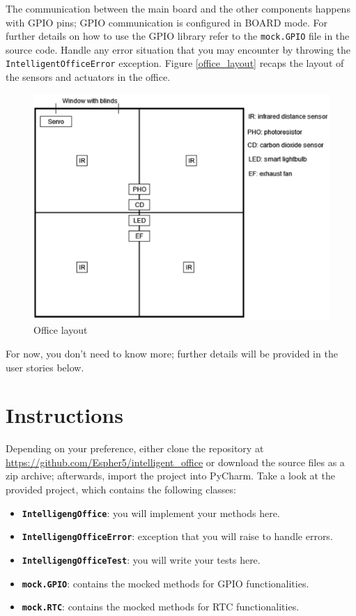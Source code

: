 The communication between the main board and the other components happens with GPIO pins; GPIO communication is configured in BOARD mode. For further details on how to use the GPIO library refer to the \texttt{mock.GPIO} file in the source code.
Handle any error situation that you may encounter by throwing the \texttt{IntelligentOfficeError} exception.
Figure \ref{office_layout} recaps the layout of the sensors and actuators in the office.

\begin{figure}[H]
    \centering
    \includegraphics[width=\linewidth]{figures/appendix/intelligent_office.png}
    \caption{Office layout}
    \label{office_layout.}
\end{figure}

For now, you don't need to know more; further details will be provided in the user stories below.

\section{Instructions}
Depending on your preference, either clone the repository at \url{https://github.com/Espher5/intelligent_office} or download the source files as a zip archive; afterwards, import the project into PyCharm. 
Take a look at the provided project, which contains the following classes: 
\begin{itemize}
    \item \textbf{\texttt{IntelligengOffice}}: you will implement your methods here.
    \item \textbf{\texttt{IntelligengOfficeError}}: exception that you will raise to handle errors.
    \item \textbf{\texttt{IntelligengOfficeTest}}: you will write your tests here.
    \item \textbf{\texttt{mock.GPIO}}: contains the mocked methods for GPIO functionalities.
    \item \textbf{\texttt{mock.RTC}}: contains the mocked methods for RTC functionalities.
\end{itemize}

